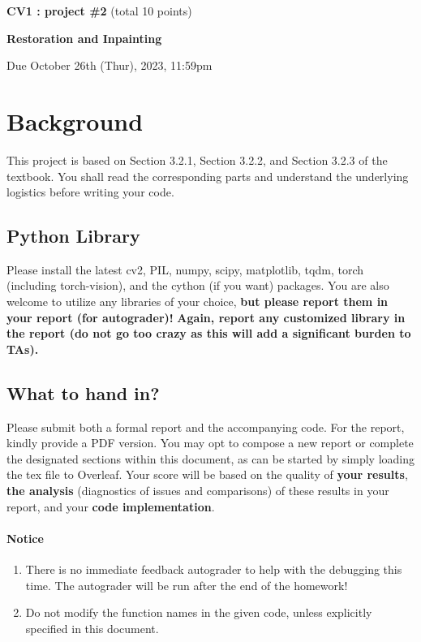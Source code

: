 \documentclass[11pt]{article}
\begin{document}
{\centering \textbf{CV1 : project \#2 } (total 10 points)

\par}{\centering \textbf{Restoration and Inpainting} \par}
{\centering Due October 26th (Thur), 2023, 11:59pm

\par}   

\section{Background} 

This project is based on Section 3.2.1, Section 3.2.2, and Section 3.2.3 of the textbook. You shall read the corresponding parts and understand the underlying logistics before writing your code.

\subsection{Python Library}
Please install the latest cv2, PIL, numpy, scipy, matplotlib, tqdm, torch (including torch-vision), and the cython (if you want) packages. You are also welcome to utilize any libraries of your choice, \textbf{but please report them in your report (for autograder)!}
\color{red}
\textbf{Again, report any customized library in the report (do not go too crazy as this will add a significant burden to TAs).}
\color{black}



\subsection{What to hand in?}

Please submit both a formal report and the accompanying code. For the report, kindly provide a PDF version. You may opt to compose a new report or complete the designated sections within this document, as can be started by simply loading the tex file to Overleaf. Your score will be based on the quality of \textbf{your results}, \textbf{the analysis} (diagnostics of issues and comparisons) of these results in your report, and your \textbf{code implementation}.

\paragraph{Notice}

\begin{enumerate}
    \item There is no immediate feedback autograder to help with the debugging this time. The autograder will be run after the end of the homework!
    \item Do not modify the function names in the given code, unless explicitly specified in this document.
\end{enumerate}
\end{document}
